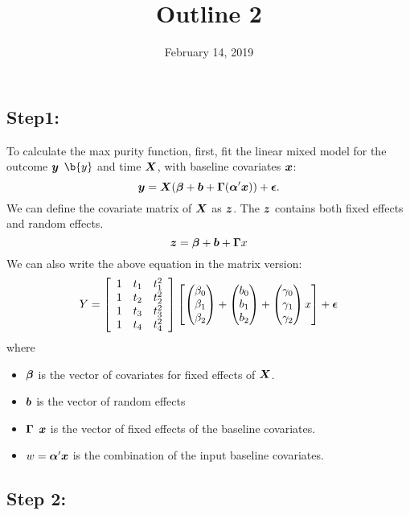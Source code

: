 \documentclass[12pt]{article}
\begin{document}
\title{Outline 2}
\date{February 14, 2019} \maketitle
\subsection{Step1: }

To calculate the max purity function, first,  
fit the linear mixed model for the outcome $\mbox{\boldmath $y$}$ \st{$\b{y}$} and time $\mbox{\boldmath $X$}$, with baseline covariates $\mbox{\boldmath $x$}$:  
$$\mbox{\boldmath $y$} = \mbox{\boldmath $X$}(\mbox{\boldmath $\beta$} +\mbox{\boldmath $b$} +\mbox{\boldmath $\Gamma$}(\mbox{\boldmath $\alpha$}'\mbox{\boldmath $x$})) + \mbox{\boldmath $\epsilon$}.$$We can define the covariate matrix of $\mbox{\boldmath $X$}$ as $\mbox{\boldmath $z$}$. The $\mbox{\boldmath $z$}$ contains both fixed effects and random effects. 
$$\mbox{\boldmath $z$} = \mbox{\boldmath $\beta$} + \mbox{\boldmath $b$} + \mbox{\boldmath $\Gamma$} x$$
We can also write the above equation in the matrix version:
$$Y = \left[\begin{array}
{rrr}
1 & t_1 & t_1^2 \\
1 & t_2 & t_2^2 \\
1 & t_3 & t_3^2 \\
1 & t_4 & t_4^2
\end{array}\right]
\left[\begin{pmatrix}
\beta_0 \\
\beta_1 \\
\beta_2
\end{pmatrix} +  
\begin{pmatrix}
b_0 \\
b_1 \\
b_2
\end{pmatrix} + 
\begin{pmatrix}
\gamma_0 \\
\gamma_1 \\
\gamma_2
\end{pmatrix} x \right] + \mbox{\boldmath $\epsilon$}$$
where 
\begin{itemize}
\item
 $\mbox{\boldmath $\beta$}$ is the vector of covariates for fixed effects of $\mbox{\boldmath $X$}$.
\item
 $\mbox{\boldmath $b$}$ is the vector of random effects 
\item
 $\mbox{\boldmath $\Gamma$}$ \st{$\mbox{\boldmath $x$}$} is the vector of fixed effects of the baseline covariates.

\item
 $w=\mbox{\boldmath $\alpha$}'\mbox{\boldmath $x$}$ is the combination of the input baseline covariates.
\end{itemize}

\subsection{Step 2:}
\end{document}
